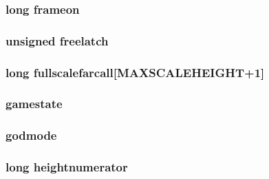 \label{WL__DEF_8H_a288677cce66771feddc15ea8cc5c36cc}
\hypertarget{WL__DEF_8H_ab2f38827113d9825faddb387c5e3994d}{
\subsubsection[{frameon}]{\setlength{\rightskip}{0pt plus 5cm}long {\bf frameon}}}
\label{WL__DEF_8H_ab2f38827113d9825faddb387c5e3994d}
\hypertarget{WL__DEF_8H_a98fdbc277691b144bd2fcbceec9047f9}{
\subsubsection[{freelatch}]{\setlength{\rightskip}{0pt plus 5cm}unsigned {\bf freelatch}}}
\label{WL__DEF_8H_a98fdbc277691b144bd2fcbceec9047f9}
\hypertarget{WL__DEF_8H_a4b3db832e1c51c7a13e5e973de3115b3}{
\subsubsection[{fullscalefarcall}]{\setlength{\rightskip}{0pt plus 5cm}long {\bf fullscalefarcall}\mbox{[}MAXSCALEHEIGHT+1\mbox{]}}}
\label{WL__DEF_8H_a4b3db832e1c51c7a13e5e973de3115b3}
\hypertarget{WL__DEF_8H_a3aae581094bd3233febed90eb582c70d}{
\subsubsection[{gamestate}]{ {\bf gamestate}}}
\label{WL__DEF_8H_a3aae581094bd3233febed90eb582c70d}
\hypertarget{WL__DEF_8H_a23bd83aac925fcfe8d07fc3bbbfc7969}{
\subsubsection[{godmode}]{ {\bf godmode}}}
\label{WL__DEF_8H_a23bd83aac925fcfe8d07fc3bbbfc7969}
\hypertarget{WL__DEF_8H_aebfb0db84258aa5fc9301a200f96b8d3}{
\subsubsection[{heightnumerator}]{\setlength{\rightskip}{0pt plus 5cm}long {\bf heightnumerator}}}
